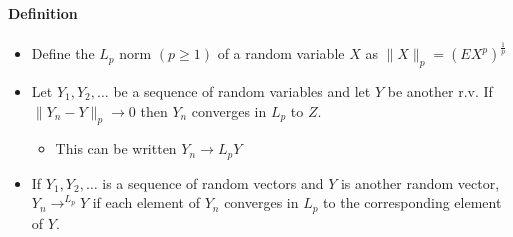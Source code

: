 \paragraph{Definition}
\begin{itemize}
\item Define the $L_p$ norm $(p \geq 1)$ of a random variable $X$ as $\|X\|_p = (E X^p)^{\frac1p}$
\item Let $Y_1, Y_2, \dots$ be a sequence of random variables and let
        $Y$ be another r.v.  If $\|Y_n - Y\|_p \to 0$ then $Y_n$
        converges in $L_p$ to $Z$.
\begin{itemize}
\item This can be written $Y_n \to{L_p} Y$
\end{itemize}
\item If $Y_1,Y_2,\dots$ is a sequence of random vectors and $Y$ is
        another random vector, $Y_n \to^{L_p} Y$ if each element of
        $Y_n$ converges in $L_p$ to the corresponding element of $Y$.
\end{itemize}

